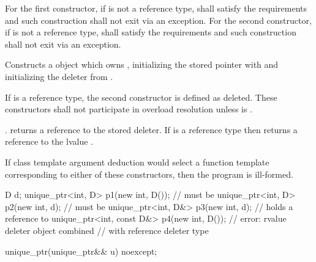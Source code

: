 \begin{itemdescr}
\pnum
\requires For the first constructor, if  is not a reference type,
 shall satisfy the  requirements and
such construction shall not exit via an exception.
For the second constructor, if  is not a reference type,
 shall satisfy the  requirements and
such construction shall not exit via an exception.

\pnum
\effects Constructs a  object which owns , initializing
the stored pointer with  and initializing the deleter
from .

\pnum
\remarks If  is a reference type,
the second constructor is defined as deleted.
These constructors shall not participate in overload resolution
unless  is .

\pnum
\ensures {}.
 returns a reference to the stored
deleter. If  is a reference type then 
returns a reference to the lvalue .

\pnum
\remarks If class template argument deduction
would select a function template corresponding to either of these constructors,
then the program is ill-formed.

\pnum
\begin{example}
\begin{codeblock}
D d;
unique_ptr<int, D> p1(new int, D());        //  must be 
unique_ptr<int, D> p2(new int, d);          //  must be 
unique_ptr<int, D&> p3(new int, d);         //  holds a reference to 
unique_ptr<int, const D&> p4(new int, D()); // error: rvalue deleter object combined
                                            // with reference deleter type
\end{codeblock}
\end{example}
\end{itemdescr}

%
\begin{itemdecl}
unique_ptr(unique_ptr&& u) noexcept;
\end{itemdecl}

